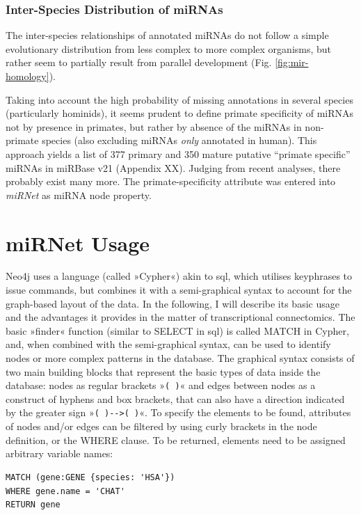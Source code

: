\subsubsection{Inter-Species Distribution of miRNAs}
The inter-species relationships of annotated miRNAs do not follow a simple evolutionary distribution from less complex to more complex organisms, but rather seem to partially result from parallel development (Fig. \ref{fig:mir-homology}). 

Taking into account the high probability of missing annotations in several species (particularly hominids), it seems prudent to define primate specificity of miRNAs not by presence in primates, but rather by absence of the miRNAs in non-primate species (also excluding miRNAs \emph{only} annotated in human). This approach yields a list of 377 primary and 350 mature putative “primate specific” miRNAs in miRBase v21 (Appendix XX). Judging from recent analyses\cite{Londin2015}, there probably exist many more. The primate-specificity attribute was entered into \emph{miRNet} as miRNA node property.

\section{miRNet Usage}
Neo4j uses a language (called »Cypher«) akin to \ac{sql}, which utilises keyphrases to issue commands, but combines it with a semi-graphical syntax to account for the graph-based layout of the data. In the following, I will describe its basic usage and the advantages it provides in the matter of transcriptional connectomics. The basic »finder« function (similar to \textcolor{dkblue}{SELECT} in \ac{sql}) is called \textcolor{dkblue}{MATCH} in Cypher, and, when combined with the semi-graphical syntax, can be used to identify nodes or more complex patterns in the database. The graphical syntax consists of two main building blocks that represent the basic types of data inside the database: nodes as regular brackets »\texttt{( )}« and edges between nodes as  a construct of hyphens and box brackets, that can also have a direction indicated by the greater sign \mbox{»\texttt{( )-\string[ \string]->( )}«}. To specify the elements to be found, attributes of nodes and/or edges can be filtered by using curly brackets in the node definition, or the \textcolor{dkblue}{WHERE} clause. To be returned, elements need to be assigned arbitrary variable names:

\begin{lstlisting}[label=lst:match, caption=MATCH, language=Cypher]
MATCH (gene:GENE {species: 'HSA'})
WHERE gene.name = 'CHAT'
RETURN gene
\end{lstlisting}

